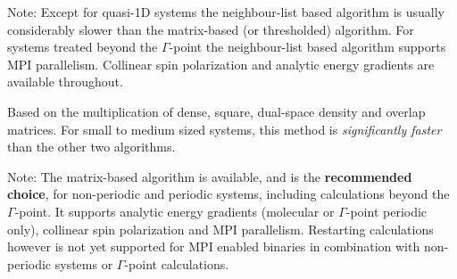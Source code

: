 \begin{description}
\begin{description}
  Note: Except for quasi-1D systems the neighbour-list based algorithm is usually
    considerably slower than the matrix-based (or thresholded) algorithm. For systems
    treated beyond the $\Gamma$-point the neighbour-list based algorithm supports MPI
    parallelism. Collinear spin polarization and analytic energy gradients are available
    throughout.

  \item[\is{MatrixBased} \cb] Based on the multiplication of dense, square, dual-space
    density and overlap matrices. For small to medium sized systems, this method is
    \emph{significantly faster} than the other two algorithms.

  Note: The matrix-based algorithm is available, and is the \textbf{recommended choice},
    for non-periodic and periodic systems, including calculations beyond the
    $\Gamma$-point. It supports analytic energy gradients (molecular or $\Gamma$-point
    periodic only), collinear spin polarization and MPI parallelism. Restarting
    calculations however is not yet supported for MPI enabled binaries in combination
    with non-periodic systems or $\Gamma$-point calculations.

  \end{description}
\end{description}

